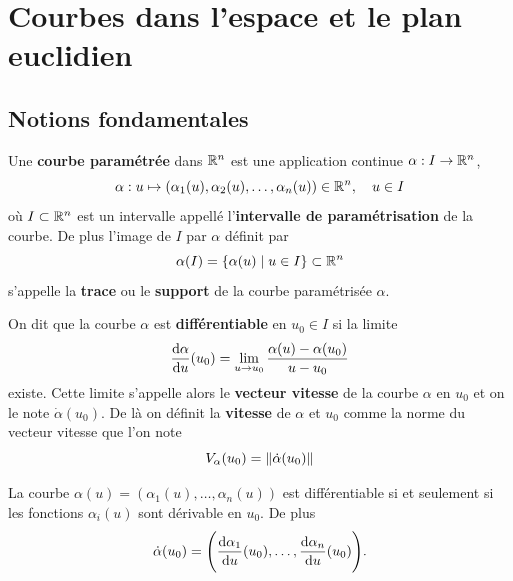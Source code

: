 \chapter{Courbes dans l'espace et le plan euclidien}

\section{Notions fondamentales}

\begin{definition}
	Une \textbf{courbe paramétrée} dans $\mathbb{R}^n$ est une application continue $\alpha : I \to \mathbb{R}^n$,
	\[
	\alpha : u \mapsto (\alpha_1(u), \alpha_2(u), \ldots, \alpha_n(u)) \in \mathbb{R}^n, \quad u \in I
	\]
	où $I \subset \mathbb{R}^n$ est un intervalle appellé l'\textbf{intervalle de paramétrisation} de la courbe. De plus l'image de $I$ par $\alpha$ définit par
	\[
	\alpha(I) = \{ \alpha(u) \mid u \in I\} \subset \mathbb{R}^n
	\]
	s'appelle la \textbf{trace} ou le \textbf{support} de la courbe paramétrisée $\alpha$.
	
	On dit que la courbe $\alpha$ est \textbf{différentiable} en $u_0 \in I$ si la limite
	\[
	\frac{\mathrm d \alpha}{\mathrm du} (u_0) = \lim_{u \to u_0} \frac{\alpha(u) - \alpha(u_0)}{u - u_0}
	\]
	existe. Cette limite s'appelle alors le \textbf{vecteur vitesse} de la courbe $\alpha$ en $u_0$ et on le note $\dot \alpha(u_0)$. De là on définit la \textbf{vitesse} de $\alpha$ et $u_0$ comme la norme du vecteur vitesse que l'on note
	\[
	V_\alpha(u_0) = \left\| \dot \alpha(u_0) \right\|
	\]
\end{definition}

\begin{lemme}
	La courbe $\alpha(u) = (\alpha_1(u), \ldots, \alpha_n(u))$ est différentiable si et seulement si les fonctions $\alpha_i(u)$ sont dérivable en $u_0$. De plus
	\[
	\dot \alpha (u_0) = \Bigg( \frac{\mathrm d \alpha_1}{\mathrm du}(u_0), \ldots, \frac{\mathrm d \alpha_n}{\mathrm du}(u_0)\Bigg).
	\]
\end{lemme}


